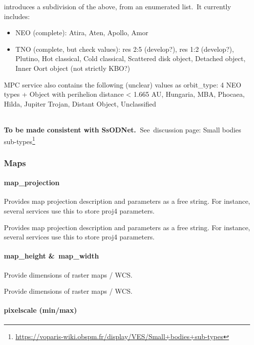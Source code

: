 \documentclass[11pt,a4paper]{ivoa}
\begin{document}
introduces a subdivision of the above, from an enumerated list. It currently includes:

\begin{itemize}
\item NEO (complete): Atira, Aten, Apollo, Amor
\item TNO (complete, but check values): res 2:5 (develop?), res 1:2 (develop?), Plutino, Hot classical, Cold classical, Scattered disk object, Detached object, Inner Oort object (not strictly KBO?)
\end{itemize}

MPC service also contains the following (unclear) values as orbit\_type: 4 NEO types + Object with perihelion distance < 1.665 AU, Hungaria, MBA, Phocaea, Hilda, Jupiter Trojan, Distant Object, Unclassified

\\

\textbf{To be made consistent with SsODNet. }See discussion page: Small bodies sub-types\footnote{\url{https://voparis-wiki.obspm.fr/display/VES/Small+bodies+sub-types}}

\subsubsection{Maps\\}

\paragraph{map\_projection}

Provides map projection description and parameters as a free string. For instance, several services use this to store proj4 parameters. 

Provides map projection description and parameters as a free string. For instance, several services use this to store proj4 parameters. 

\paragraph{map\_height \& map\_width}

Provide dimensions of raster maps / WCS.

Provide dimensions of raster maps / WCS.

\paragraph{pixelscale (min/max)}
\end{document}
